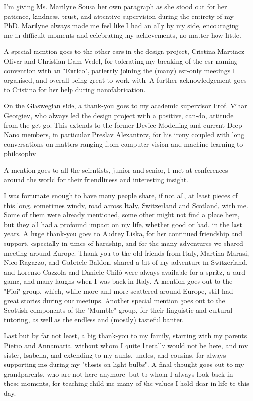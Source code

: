 I'm giving Ms. Marilyne Sousa her own paragraph as she stood out for her patience, kindness, trust, and attentive supervision during the entirety of my PhD. Marilyne always made me feel like I had an ally by my side, encouraging me in difficult moments and celebrating my achievements, no matter how little.

A special mention goes to the other \acs{esr}s in the \acs{design} project, Cristina Martinez Oliver and Christian Dam Vedel, for tolerating my breaking of the \acs{esr} naming convention with an "Enrico", patiently joining the (many) \acs{esr}-only meetings I organised, and overall being great to work with. A further acknowledgement goes to Cristina for her help during nanofabrication.

On the Glaswegian side, a thank-you goes to my academic supervisor Prof. Vihar Georgiev, who always led the \acs{design} project with a positive, can-do, attitude from the get go. This extends to the former Device Modelling and current Deep Nano members, in particular Preslav Alexantrov, for his irony coupled with long conversations on matters ranging from computer vision and machine learning to philosophy.

A mention goes to all the scientists, junior and senior, I met at conferences around the world for their friendliness and interesting insight.

I was fortunate enough to have many people share, if not all, at least pieces of this long, sometimes windy, road across Italy, Switzerland and Scotland, with me. Some of them were already mentioned, some other might not find a place here, but they all had a profound impact on my life, whether good or bad, in the last years. A huge thank-you goes to Audrey Liska, for her continued friendship and support, especially in times of hardship, and for the many adventures we shared meeting around Europe. Thank you to the old friends from Italy, Martina Marasi, Nico Ragazzo, and Gabriele Baldon, shared a bit of my adventure in Switzerland, and Lorenzo Cazzola and Daniele Chilò were always available for a spritz, a card game, and many laughs when I was back in Italy. A mention goes out to the "Fioi" group, which, while more and more scattered around Europe, still had great stories during our meetups. Another special mention goes out to the Scottish components of the "Mumble" group, for their linguistic and cultural tutoring, as well as the endless and (mostly) tasteful banter.

Last but by far not least, a big thank-you to my family, starting with my parents Pietro and Annamaria, without whom I quite literally would not be here, and my sister, Isabella, and extending to my aunts, uncles, and cousins, for always supporting me during my "thesis on light bulbs". A final thought goes out to my grandparents, who are not here anymore, but to whom I always look back in these moments, for teaching child me many of the values I hold dear in life to this day.